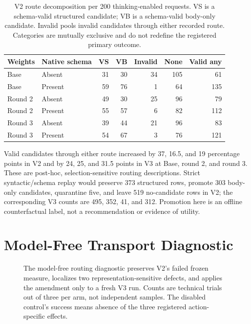 \documentclass[10pt]{article}
\begin{document}
\begin{table}[H]
\caption{V2 route decomposition per 200 thinking-enabled requests. VS is a
schema-valid structured candidate; VB is a schema-valid body-only candidate.
Invalid pools invalid candidates through either recorded route. Categories are
mutually exclusive and do not redefine the registered primary outcome.}
\label{tab:validity}
\centering
\small
\begin{tabular}{llrrrrr}
\toprule
Weights & Native schema & VS & VB & Invalid & None & Valid any \\
\midrule
Base & Absent  & 31 & 30 & 34 & 105 & 61 \\
Base & Present & 59 & 76 &  1 &  64 & 135 \\
Round 2 & Absent  & 49 & 30 & 25 & 96 & 79 \\
Round 2 & Present & 55 & 57 &  6 & 82 & 112 \\
Round 3 & Absent  & 39 & 44 & 21 & 96 & 83 \\
Round 3 & Present & 54 & 67 &  3 & 76 & 121 \\
\bottomrule
\end{tabular}
\end{table}

Valid candidates through either route increased by 37, 16.5, and 19
percentage points in V2 and by 24, 25, and 31.5 points in V3 at Base, round 2,
and round 3. These are post-hoc, selection-sensitive routing descriptions.
Strict syntactic/schema replay would preserve 373 structured rows, promote 303
body-only candidates, quarantine five, and leave 519 no-candidate rows in V2;
the corresponding V3 counts are 495, 352, 41, and 312. Promotion here is an
offline counterfactual label, not a recommendation or evidence of utility.

\section{Model-Free Transport Diagnostic}

\begin{figure}[H]
\centering
\MeasurementRepairFigure
\caption{The model-free routing diagnostic preserves V2's failed frozen
measure, localizes two representation-sensitive defects, and applies the
amendment only to a fresh V3 run. Counts are technical trials out of three per
arm, not independent samples. The disabled control's success means absence of
the three registered action-specific effects.}
\label{fig:execution-check}
\end{figure}
\end{document}
